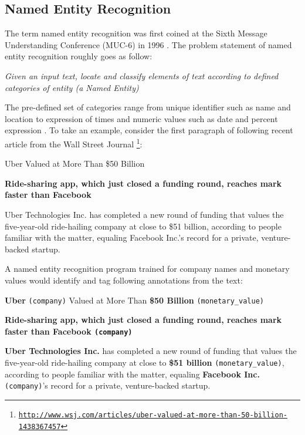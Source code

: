 \subsection{Named Entity Recognition}


The term named entity recognition was first coined at the Sixth Message Understanding Conference (MUC-6) in 1996 \citep{nadeau2007survey} \citep{grishman1996message}. The problem statement of named entity recognition roughly goes as follow:

\begin{center}
\textit{Given an input text, locate and classify elements of text according to defined categories of entity (a Named Entity)}
\end{center}

The pre-defined set of categories range from unique identifier such as name and location to expression of times and numeric values such as date and percent expression \citep{nadeau2007survey}. To take an example, consider the first paragraph of following recent article from the Wall Street Journal \footnote{\texttt{\href{http://www.wsj.com/articles/uber-valued-at-more-than-50-billion-1438367457}{http://www.wsj.com/articles/uber-valued-at-more-than-50-billion-1438367457}}}:

\begin{displayquote}
{\Large Uber Valued at More Than \$50 Billion}


\textbf{Ride-sharing app, which just closed a funding round, reaches mark faster than Facebook}

Uber Technologies Inc. has completed a new round of funding that values the five-year-old ride-hailing company at close to \$51 billion, according to people familiar with the matter, equaling Facebook Inc.’s record for a private, venture-backed startup.

\end{displayquote}

A named entity recognition program trained for company names and monetary values would identify and tag following annotations from the text:

\begin{displayquote}
{\Large \textbf{Uber} \texttt{(company)} Valued at More Than  \textbf{\$50 Billion } \texttt{(monetary\_value)}}


\textbf{Ride-sharing app, which just closed a funding round, reaches mark faster than \textbf{Facebook} \texttt{(company)}}

\textbf{Uber Technologies Inc.} has completed a new round of funding that values the five-year-old ride-hailing company at close to \textbf{\$51 billion} \texttt{(monetary\_value)}, according to people familiar with the matter, equaling \textbf{Facebook Inc.} \texttt{(company)}’s record for a private, venture-backed startup.

\end{displayquote}


